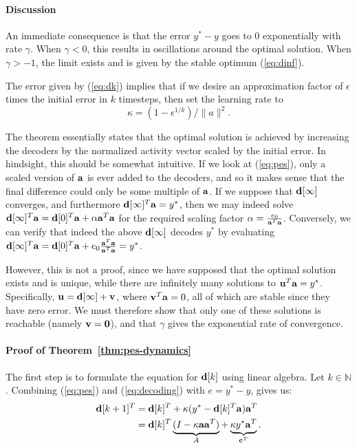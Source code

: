 \paragraph{Discussion}

An immediate consequence is that the error $y^* - y$ goes to 0 exponentially with rate $\gamma$. When $\gamma < 0$, this results in oscillations around the optimal solution. When $\gamma > - 1$, the limit exists and is given by the stable optimum (\ref{eq:dinf}). 

The error given by (\ref{eq:dk}) implies that if we desire an approximation factor of $\epsilon$ times the initial error in $k$ timesteps, then set the learning rate to $$\kappa = (1 - \epsilon^{1/k}) / \|a\|^2.$$

The theorem essentially states that the optimal solution is achieved by increasing the decoders by the normalized activity vector scaled by the initial error. In hindsight, this should be somewhat intuitive. If we look at (\ref{eq:pes}), only a scaled version of $\mathbf{a}$ is ever added to the decoders, and so it makes sense that the final difference could only be some multiple of $\mathbf{a}$. If we suppose that $\mathbf{d}[\infty]$ converges, and furthermore $\mathbf{d}[\infty]^T \mathbf{a} = y^*$, then we may indeed solve $\mathbf{d}[\infty]^T \mathbf{a} = \mathbf{d}[0]^T \mathbf{a} + \alpha \mathbf{a}^T \mathbf{a}$ for the required scaling factor $\alpha = \frac{e_0}{\mathbf{a}^T \mathbf{a}}$. Conversely, we can verify that indeed the above $\mathbf{d}[\infty]$ decodes $y^*$ by evaluating $\mathbf{d}[\infty]^T \mathbf{a} = \mathbf{d}[0]^T \mathbf{a} + e_0 \frac{\mathbf{a}^T\mathbf{a}}{\mathbf{a}^T\mathbf{a}} = y^*$.

However, this is not a proof, since we have supposed that the optimal solution exists and is unique, while there are infinitely many solutions to $\mathbf{u}^T \mathbf{a} = y^*$. Specifically, $\mathbf{u} = \mathbf{d}[\infty] + \mathbf{v}$, where $\mathbf{v}^T \mathbf{a} = 0$, all of which are stable since they have zero error. We must therefore show that only one of these solutions is reachable (namely $\mathbf{v} = \mathbf{0}$), and that $\gamma$ gives the exponential rate of convergence.

\paragraph{Proof of Theorem~\ref{thm:pes-dynamics}}

The first step is to formulate the equation for $\mathbf{d}[k]$ using linear algebra. Let $k \in \mathbb{N}$. Combining (\ref{eq:pes}) and (\ref{eq:decoding}) with $e = y^* - y$, gives us:
\begin{align*}
\mathbf{d}[k+1]^T &= \mathbf{d}[k]^T + \kappa(y^* - \mathbf{d}[k]^T \mathbf{a})\mathbf{a}^T \\ 
         &= \mathbf{d}[k]^T\underbrace{(I - \kappa \mathbf{a}\mathbf{a}^T)}_{A} + \underbrace{\kappa y^* \mathbf{a}^T}_{\mathbf{c}^T} .
\end{align*}

